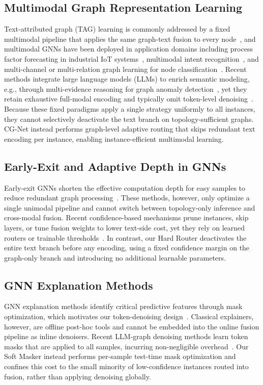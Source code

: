 \documentclass[preprint,12pt,authoryear]{elsarticle}
\begin{document}
\subsection{Multimodal Graph Representation Learning}
Text-attributed graph (TAG) learning is commonly addressed by a fixed multimodal pipeline that applies the same graph-text fusion to every node~\citep{cai2024multimodal,xu2022surveyTAG}, and multimodal GNNs have been deployed in application domains including process factor forecasting in industrial IoT systems~\citep{sun2026semantically}, multimodal intent recognition~\citep{wang2025mgc}, and multi-channel or multi-relation graph learning for node classification~\citep{zhu2023cnimgcn,liu2024mregdn}. Recent methods integrate large language models (LLMs) to enrich semantic modeling, e.g., through multi-evidence reasoning for graph anomaly detection~\citep{cheng2026graph}, yet they retain exhaustive full-modal encoding and typically omit token-level denoising~\citep{yun2023multimodal}. Because these fixed paradigms apply a single strategy uniformly to all instances, they cannot selectively deactivate the text branch on topology-sufficient graphs. CG-Net instead performs graph-level adaptive routing that skips redundant text encoding per instance, enabling instance-efficient multimodal learning.

\subsection{Early-Exit and Adaptive Depth in GNNs}
Early-exit GNNs shorten the effective computation depth for easy samples to reduce redundant graph processing~\citep{zhang2022earlyexitgnn_iclr}. These methods, however, only optimize a single unimodal pipeline and cannot switch between topology-only inference and cross-modal fusion. Recent confidence-based mechanisms prune instances, skip layers, or tune fusion weights to lower text-side cost, yet they rely on learned routers or trainable thresholds~\citep{han2026marginprune,li2026crossmodalEE,chen2026differentiabletau}. In contrast, our Hard Router deactivates the entire text branch before any encoding, using a fixed confidence margin on the graph-only branch and introducing no additional learnable parameters.

\subsection{GNN Explanation Methods}
GNN explanation methods identify critical predictive features through mask optimization, which motivates our token-denoising design~\citep{ying2019gnnexplainer}. Classical explainers, however, are offline post-hoc tools and cannot be embedded into the online fusion pipeline as inline denoisers. Recent LLM-graph denoising methods learn token masks that are applied to all samples, incurring non-negligible overhead~\citep{huang2026dynmaskllmgraph,wang2026fidelitydenoise}. Our Soft Masker instead performs per-sample test-time mask optimization and confines this cost to the small minority of low-confidence instances routed into fusion, rather than applying denoising globally.
\end{document}
